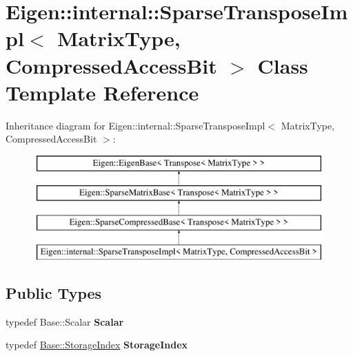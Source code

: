 \hypertarget{class_eigen_1_1internal_1_1_sparse_transpose_impl_3_01_matrix_type_00_01_compressed_access_bit_01_4}{}\section{Eigen\+::internal\+::Sparse\+Transpose\+Impl$<$ Matrix\+Type, Compressed\+Access\+Bit $>$ Class Template Reference}
\label{class_eigen_1_1internal_1_1_sparse_transpose_impl_3_01_matrix_type_00_01_compressed_access_bit_01_4}
Inheritance diagram for Eigen\+::internal\+::Sparse\+Transpose\+Impl$<$ Matrix\+Type, Compressed\+Access\+Bit $>$\+:\begin{figure}[H]
\begin{center}
\leavevmode
\includegraphics[height=4.000000cm]{class_eigen_1_1internal_1_1_sparse_transpose_impl_3_01_matrix_type_00_01_compressed_access_bit_01_4}
\end{center}
\end{figure}
\subsection*{Public Types}
\begin{DoxyCompactItemize}
\item 
\mbox{\label{class_eigen_1_1internal_1_1_sparse_transpose_impl_3_01_matrix_type_00_01_compressed_access_bit_01_4_a1b4691c1642c270f2d965fc0d279b56a}} 
typedef Base\+::\+Scalar {\bfseries Scalar}
\item 
\mbox{\label{class_eigen_1_1internal_1_1_sparse_transpose_impl_3_01_matrix_type_00_01_compressed_access_bit_01_4_a4062a1c89d1858f3bddb72a74cda910c}} 
typedef \mbox{\hyperlink{class_eigen_1_1_sparse_matrix_base_a0b540ba724726ebe953f8c0df06081ed}{Base\+::\+Storage\+Index}} {\bfseries Storage\+Index}
\end{DoxyCompactItemize}
